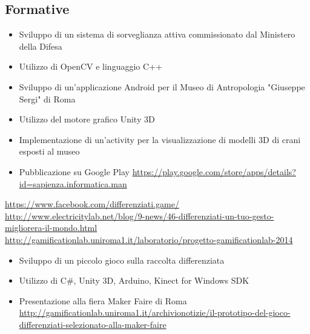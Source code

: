 \documentclass[11pt,a4paper,sans]{moderncv} %
\begin{document}
\subsection{Formative}

{
	\begin{itemize}
		\item Sviluppo di un sistema di sorveglianza attiva commissionato dal Ministero della Difesa
		\item Utilizzo di OpenCV e linguaggio C++
	\end{itemize}
}

{
	\begin{itemize}
		\item Sviluppo di un'applicazione Android per il Museo di Antropologia "Giuseppe Sergi" di Roma
		\item Utilizzo del motore grafico Unity 3D
		\item Implementazione di un'activity per la visualizzazione di modelli 3D di crani esposti al museo
		\item Pubblicazione su Google Play
		\newline{}
		\url{https://play.google.com/store/apps/details?id=sapienza.informatica.man}
	\end{itemize}
}

{
	\url{https://www.facebook.com/differenziati.game/}
	\newline{}
	\url{http://www.electricitylab.net/blog/9-news/46-differenziati-un-tuo-gesto-migliorera-il-mondo.html}
	\newline{}
	\url{http://gamificationlab.uniroma1.it/laboratorio/progetto-gamificationlab-2014}
	\begin{itemize}
		\item Sviluppo di un piccolo gioco sulla raccolta differenziata
		\item Utilizzo di C\#, Unity 3D, Arduino, Kinect for Windows SDK
		\item Presentazione alla fiera Maker Faire di Roma
		\newline{} \url{http://gamificationlab.uniroma1.it/archivionotizie/il-prototipo-del-gioco-differenziati-selezionato-alla-maker-faire}
	\end{itemize}
}
\end{document}
